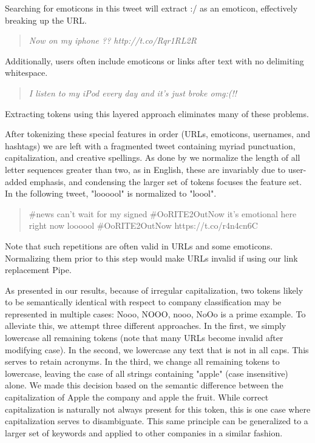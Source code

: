 \documentclass[letterpaper]{article}
\begin{document}
Searching for emoticons in this tweet will extract :/ as an emoticon, effectively breaking up the URL.
\begin{quote}
\textit{Now on my iphone ?? http://t.co/Rqr1RL2R}
\end{quote}

Additionally, users often include emoticons or links after text with no delimiting whitespace. 

\begin{quote}
\textit{I listen to my iPod every day and it's just broke omg:(!!}
\end{quote}

Extracting tokens using this layered approach eliminates many of these problems.

After tokenizing these special features in order (URLs, emoticons, usernames, and hashtags) we are left with a fragmented tweet containing myriad punctuation, capitalization, and creative spellings. As done by \citet{potts2011} we normalize the length of all letter sequences greater than two, as in English, these are invariably due to user-added emphasis, and condensing the larger set of tokens focuses the feature set. In the following tweet, "loooool" is normalized to "loool".
\begin{quote}
\#news can't wait for my signed \#OoRITE2OutNow it's emotional here right now loooool \#OoRITE2OutNow https://t.co/r4n4cn6C 
\end{quote}

Note that such repetitions are often valid in URLs and some emoticons. Normalizing them prior to this step would make URLs invalid if using our link replacement Pipe.

As presented in our results, because of irregular capitalization, two tokens likely to be semantically identical with respect to company classification may be represented in multiple cases: {Nooo, NOOO, nooo, NoOo} is a prime example. To alleviate this, we attempt three different approaches. In the first, we simply lowercase all remaining tokens (note that many URLs become invalid after modifying case). In the second, we lowercase any text that is not in all caps. This serves to retain acronyms. In the third, we change all remaining tokens to lowercase, leaving the case of all strings containing "apple" (case insensitive) alone. We made this decision based on the semantic difference between the capitalization of Apple the company and apple the fruit. While correct capitalization is naturally not always present for this token, this is one case where capitalization serves to disambiguate. This same principle can be generalized to a larger set of keywords and applied to other companies in a similar fashion. 
\end{document}
